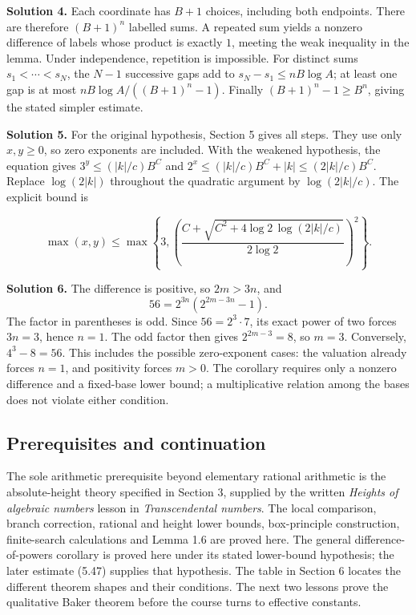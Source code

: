 \documentclass[
  11pt,
  a4paper,
]{article}
\begin{document}
\textbf{Solution 4.} Each coordinate has \(B+1\) choices, including both
endpoints. There are therefore \((B+1)^n\) labelled sums. A repeated sum
yields a nonzero difference of labels whose product is exactly \(1\),
meeting the weak inequality in the lemma. Under independence, repetition
is impossible. For distinct sums \(s_1<\cdots<s_N\), the \(N-1\)
successive gaps add to \(s_N-s_1\le nB\log A\); at least one gap is at
most \(nB\log A/((B+1)^n-1)\). Finally \((B+1)^n-1\ge B^n\), giving the
stated simpler estimate.

\textbf{Solution 5.} For the original hypothesis, Section 5 gives all
steps. They use only \(x,y\ge0\), so zero exponents are included. With
the weakened hypothesis, the equation gives \(3^y\le(|k|/c)B^C\) and
\(2^x\le(|k|/c)B^C+|k|\le(2|k|/c)B^C\). Replace \(\log(2|k|)\)
throughout the quadratic argument by \(\log(2|k|/c)\). The explicit
bound is

\[
\max(x,y)\le\max\left\{3,
\left(\frac{C+\sqrt{C^2+4\log2\,\log(2|k|/c)}}{2\log2}\right)^2\right\}.
\]

\textbf{Solution 6.} The difference is positive, so \(2m>3n\), and \[
56=2^{3n}(2^{2m-3n}-1).
\] The factor in parentheses is odd. Since \(56=2^3\cdot7\), its exact
power of two forces \(3n=3\), hence \(n=1\). The odd factor then gives
\(2^{2m-3}=8\), so \(m=3\). Conversely, \(4^3-8=56\). This includes the
possible zero-exponent cases: the valuation already forces \(n=1\), and
positivity forces \(m>0\). The corollary requires only a nonzero
difference and a fixed-base lower bound; a multiplicative relation among
the bases does not violate either condition.

\subsection{Prerequisites and
continuation}\label{prerequisites-and-continuation}

The sole arithmetic prerequisite beyond elementary rational arithmetic
is the absolute-height theory specified in Section 3, supplied by the
written \emph{Heights of algebraic numbers} lesson in
\emph{Transcendental numbers}. The local comparison, branch correction,
rational and height lower bounds, box-principle construction,
finite-search calculations and Lemma 1.6 are proved here. The general
difference-of-powers corollary is proved here under its stated
lower-bound hypothesis; the later estimate (5.47) supplies that
hypothesis. The table in Section 6 locates the different theorem shapes
and their conditions. The next two lessons prove the qualitative Baker
theorem before the course turns to effective constants.
\end{document}
